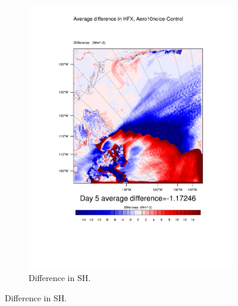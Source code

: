 \begin{figure}
\begin{subfigure}{0.48\textwidth}
		\includegraphics[width=\textwidth]{results/aero10ni/diff_Aero10NoIce_HFX_Day5.pdf}
		\caption{Difference in SH.}
		\label{subfig:sh_r4Day5}
	\end{subfigure}


\end{figure}
